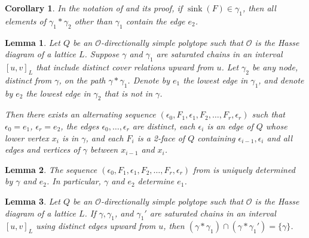 \documentclass[10pt,a4paper]{amsart}
\newtheorem{lem}{Lemma}
\newtheorem{cor}{Corollary}
\DeclareMathOperator{\sink}{sink}
\begin{document}
\begin{cor}\label{cor:sink-lemma}
In the notation of  and its proof, if $\sink(F)\in \gamma_1$, then all elements of $\gamma_1 * \gamma_2$ other than $\gamma_1$ contain the edge $e_2$.
\end{cor}

\begin{lem}\label{lem:unique-sequence}
Let $Q$ be an $\mathcal{O}$-directionally simple polytope such that $\mathcal{O}$ is the Hasse diagram of a lattice $L$.   Suppose  $\gamma $ and $\gamma_1$ are saturated chains in an interval $[u,v]_L$ that include distinct cover relations upward from $u$.  Let $\gamma_2$ be any node, distinct from $\gamma $, 
on the path $\gamma * \gamma_1$.   Denote by $e_1$  the lowest edge in $\gamma_1$, and denote by  $e_2$ the lowest edge in $\gamma_2$ that is  not in $\gamma$.  
  
Then there exists an  alternating sequence $(\epsilon_0,F_1,\epsilon_1,F_2,\dots ,F_r,\epsilon_r)$ such that  $\epsilon_0 = e_1$, $\epsilon_r = e_2$, the edges $\epsilon_0,\dots ,\epsilon_r$ are distinct, 
each  $\epsilon_i$ is an edge of $Q$ whose lower vertex $x_i$ is in $\gamma$,  and
 each $F_i$ is a 2-face of $Q$ containing  $\epsilon_{i-1}, \epsilon_i$ and  all edges and vertices of $\gamma$ between $x_{i-1}$ and $x_i$.
\end{lem}

\begin{lem}\label{lem:what-determines}
 The sequence $(\epsilon_0,F_1,\epsilon_1,F_2,\dots ,F_r,\epsilon_r)$ from  
  is uniquely determined by $\gamma $ and $e_2$. In particular, $\gamma$ and $e_2$ determine $e_1$. 
\end{lem}

\begin{lem}\label{lem:vertex-disjoint}
Let $Q$ be an $\mathcal{O}$-directionally simple polytope such that $\mathcal{O}$ is the Hasse diagram of a lattice $L$.   If $\gamma, \gamma_1$, and $\gamma_1'$ are saturated chains in an interval $[u,v]_L$ using distinct edges upward from $u$, then $(\gamma * \gamma_1) \cap (\gamma * \gamma_1')=\{\gamma\}$.
\end{lem}
\end{document}
